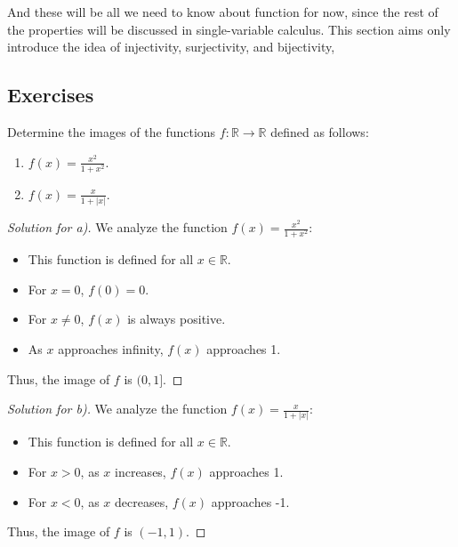 \documentclass[
	12pt, %
	fleqn, %
	a4paper, %
]{LegrandOrangeBook}
\begin{document}
And these will be all we need to know about function for now, since the rest of the properties will be discussed in single-variable calculus. This section aims only introduce the idea of injectivity, surjectivity, and bijectivity, 

\subsection{Exercises}
\begin{exercise}
    Determine the images of the functions \( f: \mathbb{R} \rightarrow \mathbb{R} \) defined as follows:
    \begin{enumerate}
        \item[a)] \( f(x) = \frac{x^2}{1 + x^2} \).
        \item[b)] \( f(x) = \frac{x}{1 + |x|} \).
    \end{enumerate}
\end{exercise}
\begin{proof}[Solution for a)]
    We analyze the function \( f(x) = \frac{x^2}{1 + x^2} \):
    \begin{itemize}
        \item This function is defined for all \( x \in \mathbb{R} \).
        \item For \( x = 0 \), \( f(0) = 0 \).
        \item For \( x \neq 0 \), \( f(x) \) is always positive.
        \item As \( x \) approaches infinity, \( f(x) \) approaches 1.
    \end{itemize}
    Thus, the image of \( f \) is \( (0, 1] \).
    \end{proof}
    
    \begin{proof}[Solution for b)]
    We analyze the function \( f(x) = \frac{x}{1 + |x|} \):
    \begin{itemize}
        \item This function is defined for all \( x \in \mathbb{R} \).
        \item For \( x > 0 \), as \( x \) increases, \( f(x) \) approaches 1.
        \item For \( x < 0 \), as \( x \) decreases, \( f(x) \) approaches -1.
    \end{itemize}
    Thus, the image of \( f \) is \( (-1, 1) \).
    \end{proof}



\end{document}
